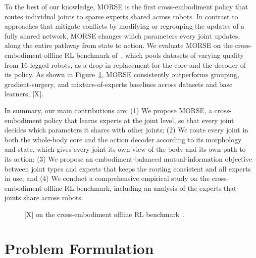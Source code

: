 To the best of our knowledge, MORSE is the first cross-embodiment policy that routes individual joints to sparse
experts shared across robots. In contrast to approaches that mitigate conflicts by modifying or regrouping the updates of
a fully shared network, MORSE changes which parameters every joint updates, along the entire pathway from state to
action. We evaluate MORSE on the cross-embodiment offline RL benchmark of~\citet{abe2026crossembodimentoffline}, which
pools datasets of varying quality from 16 legged robots, as a drop-in replacement for the core and the decoder of its
policy. As shown in Figure~\ref{fig:teaser}, MORSE consistently outperforms grouping, gradient-surgery, and
mixture-of-experts baselines across datasets and base learners, [X].

In summary, our main contributions are: (1) We propose MORSE, a cross-embodiment policy that learns experts at the joint
level, so that every joint decides which parameters it shares with other joints; (2) We route every joint in both the
whole-body core and the action decoder according to its morphology and state, which gives every joint its own view of
the body and its own path to its action; (3) We propose an embodiment-balanced mutual-information objective between
joint types and experts that keeps the routing consistent and all experts in use; and (4) We conduct a comprehensive
empirical study on the cross-embodiment offline RL benchmark, including an analysis of the experts that joints share
across robots.

\begin{figure}[t]
\centering
\fbox{\rule{0pt}{1.4in}\rule{0.95\linewidth}{0pt}}
\caption{[X] on the cross-embodiment offline RL benchmark~\citep{abe2026crossembodimentoffline}.}
\label{fig:teaser}
\end{figure}

\section{Problem Formulation}
\label{sec:problem}

